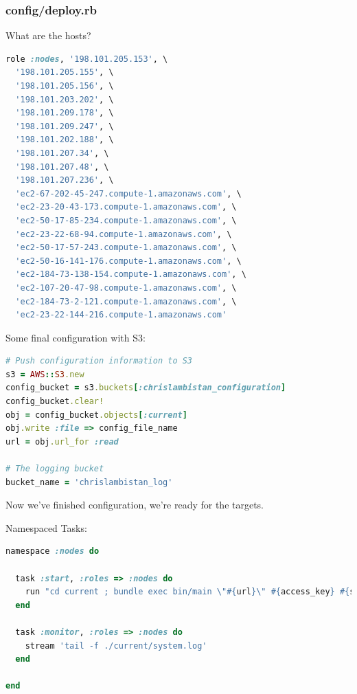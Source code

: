 \documentclass[t,handout]{beamer}
\begin{document}
\begin{frame}[fragile]
\frametitle{config/deploy.rb}
What are the hosts?
\begin{lstlisting}[frame=none,
  language=Ruby,
  basicstyle=\tiny\ttfamily\color{black},
  commentstyle=\tiny\ttfamily\color{red},
  stringstyle=\tiny\ttfamily\color{violet}]
role :nodes, '198.101.205.153', \
  '198.101.205.155', \
  '198.101.205.156', \
  '198.101.203.202', \
  '198.101.209.178', \
  '198.101.209.247', \
  '198.101.202.188', \
  '198.101.207.34', \
  '198.101.207.48', \
  '198.101.207.236', \
  'ec2-67-202-45-247.compute-1.amazonaws.com', \
  'ec2-23-20-43-173.compute-1.amazonaws.com', \
  'ec2-50-17-85-234.compute-1.amazonaws.com', \
  'ec2-23-22-68-94.compute-1.amazonaws.com', \
  'ec2-50-17-57-243.compute-1.amazonaws.com', \
  'ec2-50-16-141-176.compute-1.amazonaws.com', \
  'ec2-184-73-138-154.compute-1.amazonaws.com', \
  'ec2-107-20-47-98.compute-1.amazonaws.com', \
  'ec2-184-73-2-121.compute-1.amazonaws.com', \
  'ec2-23-22-144-216.compute-1.amazonaws.com'
\end{lstlisting}
\end{frame}

\begin{frame}[fragile]
Some final configuration with S3:
\begin{lstlisting}[frame=none,
  language=Ruby,
  basicstyle=\scriptsize\ttfamily\color{black},
  commentstyle=\scriptsize\ttfamily\color{red},
  stringstyle=\scriptsize\ttfamily\color{violet}]
# Push configuration information to S3
s3 = AWS::S3.new
config_bucket = s3.buckets[:chrislambistan_configuration]
config_bucket.clear!
obj = config_bucket.objects[:current]
obj.write :file => config_file_name
url = obj.url_for :read

# The logging bucket
bucket_name = 'chrislambistan_log'
\end{lstlisting}
Now we've finished configuration, we're ready for the targets.
\end{frame}

\begin{frame}[fragile]
Namespaced Tasks:
\begin{lstlisting}[frame=none,
  language=Ruby,
  basicstyle=\scriptsize\ttfamily\color{black},
  commentstyle=\scriptsize\ttfamily\color{red},
  stringstyle=\scriptsize\ttfamily\color{violet}]
namespace :nodes do

  task :start, :roles => :nodes do
    run "cd current ; bundle exec bin/main \"#{url}\" #{access_key} #{secret_key} #{bucket_name}"
  end

  task :monitor, :roles => :nodes do
    stream 'tail -f ./current/system.log'
  end
  
end

\end{lstlisting}
\end{frame}
\end{document}
